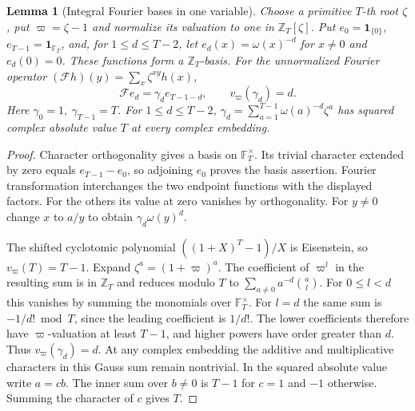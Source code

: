 \documentclass[a4paper,11pt]{article}
\newtheorem{lemma}[proposition]{Lemma}
\theoremstyle{definition}
\theoremstyle{remark}
\newcommand{\ZZ}{\mathbb Z}\newcommand{\ord}{\operatorname{ord}}
\numberwithin{equation}{section}
\begin{document}
\begin{lemma}[Integral Fourier bases in one variable]\label{lem:gauss89}
Choose a primitive \(T\)-th root \(\zeta\), put
\(\varpi=\zeta-1\) and normalize its valuation to one in
\(\ZZ_T[\zeta]\). Put \(e_0=\mathbf1_{\{0\}}\),
\(e_{T-1}=\mathbf1_{\mathbb F_T}\), and, for \(1\le d\le T-2\),
let \(e_d(x)=\omega(x)^{-d}\) for \(x\ne0\) and \(e_d(0)=0\).
These functions form a \(\ZZ_T\)-basis. For the unnormalized
Fourier operator \((\mathcal Fh)(y)=\sum_x\zeta^{xy}h(x)\),
\[
      \mathcal Fe_d=\gamma_d e_{T-1-d},\qquad
      v_\varpi(\gamma_d)=d .
\]
Here \(\gamma_0=1,\ \gamma_{T-1}=T\). For \(1\le d\le T-2\),
\(\gamma_d=\sum_{a=1}^{T-1}\omega(a)^{-d}\zeta^a\) has squared
complex absolute value \(T\) at every complex embedding.
\end{lemma}
\begin{proof}
Character orthogonality gives a basis on \(\mathbb F_T^\times\).
Its trivial character extended by zero equals \(e_{T-1}-e_0\),
so adjoining \(e_0\) proves the basis assertion. Fourier
transformation interchanges the two endpoint functions with the
displayed factors. For the others its value at zero vanishes by
orthogonality. For \(y\ne0\) change \(x\) to \(a/y\) to obtain
\(\gamma_d\omega(y)^d\).

The shifted cyclotomic polynomial
\(((1+X)^T-1)/X\) is Eisenstein, so \(v_\varpi(T)=T-1\).
Expand \(\zeta^a=(1+\varpi)^a\). The coefficient of
\(\varpi^l\) in the resulting sum is in \(\ZZ_T\) and reduces
modulo \(T\) to \(\sum_{a\ne0}a^{-d}\binom al\).
For \(0\le l<d\) this vanishes by summing the monomials over
\(\mathbb F_T^\times\). For \(l=d\) the same sum is
\(-1/d!\bmod T\), since the leading coefficient is \(1/d!\).
The lower coefficients therefore have \(\varpi\)-valuation
at least \(T-1\), and higher powers have order greater than
\(d\). Thus \(v_\varpi(\gamma_d)=d\). At any complex embedding
the additive and multiplicative characters in this Gauss sum
remain nontrivial. In the squared absolute value write \(a=cb\).
The inner sum over \(b\ne0\) is \(T-1\) for \(c=1\) and
\(-1\) otherwise. Summing the character of \(c\) gives \(T\).
\end{proof}
\end{document}
